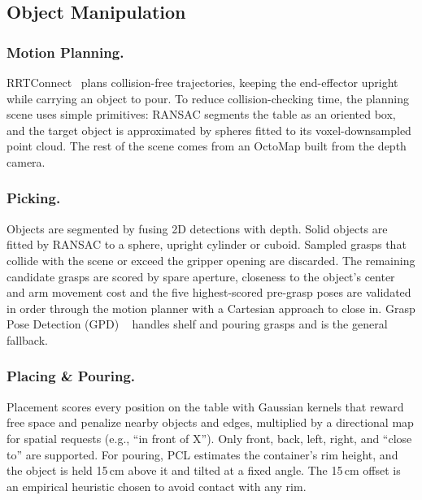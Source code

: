 \subsection{Object Manipulation}

\subsubsection{Motion Planning.}
RRTConnect~\cite{kuffner2000rrt} plans collision-free trajectories, keeping the end-effector upright while carrying an object to pour. To reduce collision-checking time, the planning scene uses simple primitives: RANSAC segments the table as an oriented box, and the target object is approximated by spheres fitted to its voxel-downsampled point cloud. The rest of the scene comes from an OctoMap built from the depth camera.

\subsubsection{Picking.}
Objects are segmented by fusing 2D detections with depth. Solid objects are fitted by RANSAC to a sphere, upright cylinder or cuboid. Sampled grasps that collide with the scene or exceed the gripper opening are discarded. The remaining candidate grasps are scored by spare aperture, closeness to the object's center and arm movement cost and the five highest-scored pre-grasp poses are validated in order through the motion planner with a Cartesian approach to close in. Grasp Pose Detection (GPD) ~\cite{ten2017grasp} handles shelf and pouring grasps and is the general fallback.

\subsubsection{Placing \& Pouring.}
Placement scores every position on the table with Gaussian kernels that reward free space and penalize nearby objects and edges, multiplied by a directional map for spatial requests (e.g., ``in front of X''). Only front, back, left, right, and ``close to'' are supported. For pouring, PCL estimates the container's rim height, and the object is held 15\,cm above it and tilted at a fixed angle. The 15\,cm offset is an empirical heuristic chosen to avoid contact with any rim.

